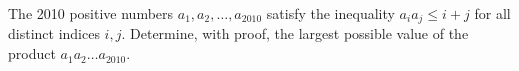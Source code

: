 The 2010 positive numbers $a_1, a_2, \ldots , a_{2010}$ satisfy the inequality $a_ia_j \le i+j$ for all distinct indices $i, j$. Determine, with proof, the largest possible value of the product $a_1a_2\ldots a_{2010}$.